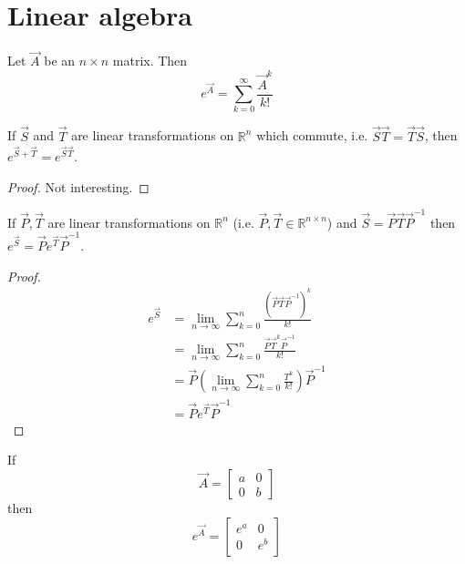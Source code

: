 \section{Linear algebra}
\begin{definition}
	Let $\vec A$ be an $n \times n$ matrix. Then
	\begin{equation}
		e^{\vec A} = \sum_{k = 0}^\infty \frac{\vec A^k}{k!}
	\end{equation}
\end{definition}

\begin{proposition}
	\label{prop:la:commute}
	If $\vec S$ and $\vec T$ are linear transformations on $\mathbb R^n$ which commute, i.e. $\vec S \vec T = \vec T \vec S$, then $e^{\vec S + \vec T} = e^{\vec S \vec T}$.
\end{proposition}

\begin{proof}
	Not interesting.
\end{proof}

\begin{proposition}
	\label{prop:la:ptp}
	If $\vec P, \vec T$ are linear transformations on $\mathbb R^n$ (i.e. $\vec P, \vec T \in \mathbb R^{n \times n}$) and $\vec S = \vec P \vec T \vec P^{-1}$ then $e^{\vec S} = \vec P e^{\vec T} \vec P^{-1}$.
\end{proposition}

\begin{proof}
	\begin{align*}
		e^{\vec S} 	&= \lim_{n \to \infty} \sum_{k = 0}^n \frac{(\vec P \vec T \vec P^{-1})^k}{k!} \\
						&= \lim_{n \to \infty} \sum_{k = 0}^n \frac{\vec P \vec T^k \vec P^{-1}}{k!} \\
						&= \vec P \left(\lim_{n \to \infty} \sum_{k = 0}^n \frac{T^k}{k!} \right) \vec P^{-1} \\
						&= \vec P e^{\vec T} \vec P^{-1}
	\end{align*}
\end{proof}

\begin{proposition}
	\label{prop:la:distinct}
	If
	\begin{equation*}
		\vec A =
		\begin{bmatrix}
			a & 0 \\
			0 & b
		\end{bmatrix}
	\end{equation*}
	then
	\begin{equation*}
		e^{\vec A} =
		\begin{bmatrix}
			e^a & 0 \\
			0 & e^b
		\end{bmatrix}
	\end{equation*}
\end{proposition}

